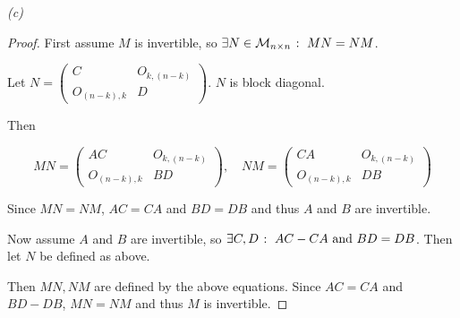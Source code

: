 \documentclass[12pt, a4paper]{article}
\begin{document}
\textit{(c)}
\begin{proof}
    First assume $M$ is invertible, so
    $\exists N \in \mathcal{M}_{n \times n} \; \colon \; MN = NM$.

    Let $N = \begin{pmatrix}C&O_{k,(n-k)}\\O_{(n-k),k}&D\end{pmatrix}$.
    $N$ is block diagonal.
    
    Then

    \[
        MN = \begin{pmatrix}
            AC & O_{k,(n-k)}\\
            O_{(n-k),k} & BD
        \end{pmatrix},\quad
        NM = \begin{pmatrix}
            CA & O_{k,(n-k)}\\
            O_{(n-k),k} & DB
        \end{pmatrix}
    \]

    Since $MN = NM$, $AC = CA$ and $BD = DB$ and thus $A$ and $B$
    are invertible.

    Now assume $A$ and $B$ are invertible, so
    $\exists C, D \; \colon \; AC - CA \text{ and } BD = DB$.
    Then let $N$ be defined as above.

    Then $MN, NM$ are defined by the above equations.
    Since $AC = CA$ and $BD - DB$, $MN = NM$ and thus $M$ is invertible.
\end{proof}
\end{document}
